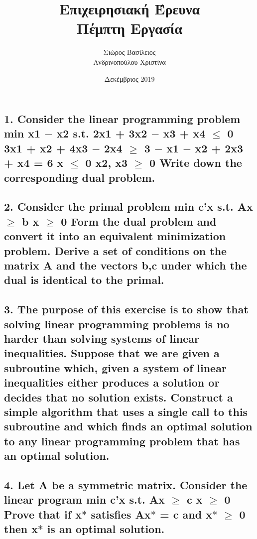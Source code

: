 \documentclass[12pt]{article}
\title{\hugeΑλγοριθμική Επιχειρησιακή Έρευνα\\Πέμπτη Εργασία}
\author{Σιώρος Βασίλειος\\Ανδρινοπούλου Χριστίνα}
\date{Δεκέμβριος 2019}
\begin{document}
\maketitle


\pagebreak


\subsection*{1. Consider the linear programming problem
min x1 \ensuremath{-} x2
s.t. 2x1 + 3x2 \ensuremath{-} x3 + x4 \ensuremath{\leq} 0
3x1 + x2 + 4x3 \ensuremath{-} 2x4 \ensuremath{\geq} 3
\ensuremath{-} x1 \ensuremath{-} x2 + 2x3 + x4 = 6
x \ensuremath{\leq} 0
x2, x3 \ensuremath{\geq} 0
Write down the corresponding dual problem.}

\vspace{2in}

\pagebreak

\subsection*{2. Consider the primal problem
min c'x
s.t. Ax \ensuremath{\geq} b
x \ensuremath{\geq} 0
Form the dual problem and convert it into an equivalent minimization problem. Derive a set of
conditions on the matrix A and the vectors b,c under which the dual is identical to the primal.}

\vspace{2in}

\pagebreak

\subsection*{3. The purpose of this exercise is to show that solving linear programming
problems is no harder than solving systems of linear inequalities. Suppose that we are given
a subroutine which, given a system of linear inequalities either produces a solution or decides
that no solution exists. Construct a simple algorithm that uses a single call to this subroutine
and which finds an optimal solution to any linear programming problem that has an optimal
solution.}

\vspace{2in}

\pagebreak

\subsection*{4. Let A be a symmetric matrix. Consider the linear program
min c'x
s.t. Ax \ensuremath{\geq} c
x \ensuremath{\geq} 0
Prove that if x\ensuremath{*} satisfies Ax\ensuremath{*} = c and x\ensuremath{*} \ensuremath{\geq} 0 then x\ensuremath{*} is an optimal solution.}
\end{document}
